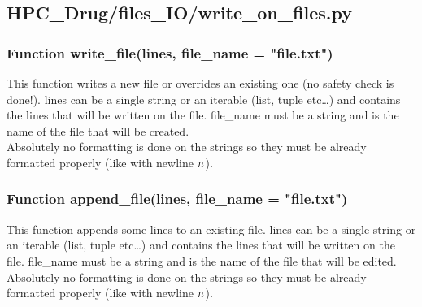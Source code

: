 

\subsection{HPC\_Drug/files\_IO/write\_on\_files.py}

    \subsubsection{Function write\_file(lines, file\_name = "file.txt")}
        
        This function writes a new file or overrides an existing one (no safety check is done!).
        lines can be a single string or an iterable (list, tuple etc\dots) and contains the lines that will be written on the file.
        file\_name must be a string and is the name of the file that will be created.
            \\
        Absolutely no formatting is done on the strings so they must be already formatted properly (like with newline $\\n$).

    \subsubsection{Function append\_file(lines, file\_name = "file.txt")}

        This function appends some lines to an existing file.
        lines can be a single string or an iterable (list, tuple etc\dots) and contains the lines that will be written on the file.
        file\_name must be a string and is the name of the file that will be edited.
            \\
        Absolutely no formatting is done on the strings so they must be already formatted properly (like with newline $\\n$).
        